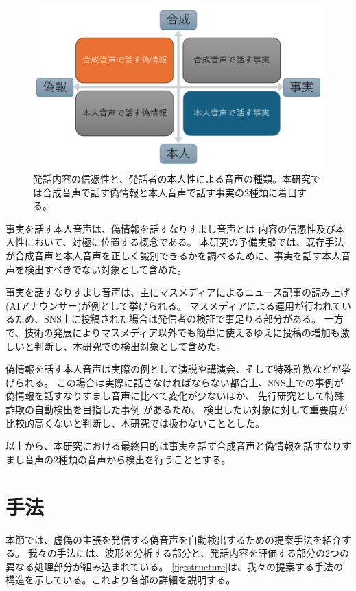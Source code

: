 \begin{figure}[p]
    \centering
    \includegraphics[width=\linewidth]{figures/D論概念図.pdf}
    \caption{発話内容の信憑性と、発話者の本人性による音声の種類。本研究では合成音声で話す偽情報と本人音声で話す事実の2種類に着目する。}
    \label{fig:twoPerspective}
\end{figure}

事実を話す本人音声は、偽情報を話すなりすまし音声とは
内容の信憑性及び本人性において、対極に位置する概念である。
本研究の予備実験では、既存手法が合成音声と本人音声を正しく識別できるかを調べるために、事実を話す本人音声を検出すべきでない対象として含めた。

事実を話すなりすまし音声は、主にマスメディアによるニュース記事の読み上げ(AIアナウンサー)が例として挙げられる\cite{nhk2020,nhkAnnual2020}。
マスメディアによる運用が行われているため、SNS上に投稿された場合は発信者の検証で事足りる部分がある。
一方で、技術の発展によりマスメディア以外でも簡単に使えるゆえに投稿の増加も激しいと判断し、本研究での検出対象として含めた。

偽情報を話す本人音声は実際の例として演説や講演会、そして特殊詐欺などが挙げられる。
この場合は実際に話さなければならない都合上、SNS上での事例が偽情報を話すなりすまし音声に比べて変化が少ないほか、
先行研究として特殊詐欺の自動検出を目指した事例 \cite{近野恵2023}があるため、
検出したい対象に対して重要度が比較的高くないと判断し、本研究では扱わないこととした。

以上から、本研究における最終目的は事実を話す合成音声と偽情報を話すなりすまし音声の2種類の音声から検出を行うこととする。

\section{手法}\label{sec:cnt_mtd}
本節では、虚偽の主張を発信する偽音声を自動検出するための提案手法を紹介する。
我々の手法には、波形を分析する部分と、発話内容を評価する部分の2つの異なる処理部分が組み込まれている。
\cref{fig:structure}は、我々の提案する手法の構造を示している。これより各部の詳細を説明する。


